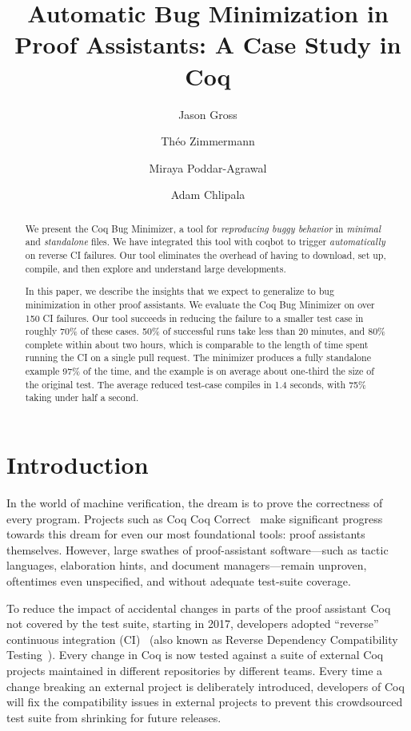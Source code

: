 \documentclass[a4paper,USenglish,cleveref,autoref,thm-restate]{lipics-v2021}
\title{Automatic Bug Minimization in Proof Assistants: A Case Study in Coq}
\author{Jason Gross}{CSAIL, Massachusetts Institute of Technology, 77 Massachusetts Ave., Cambridge, MA 02139, USA \and MIRI, USA \and \url{https://jasongross.github.io/} }{jgross@mit.edu}{https://orcid.org/0000-0002-9427-4891}{}%
\author{Théo Zimmermann}{Inria, Université de Paris, CNRS, IRIF, F-75013, Paris, France \and \url{https://www.theozimmermann.net} }{theo@irif.fr}{https://orcid.org/0000-0002-3580-8806}{}
\author{Miraya Poddar-Agrawal}{Reed College, 3203 SE Woodstock Blvd, Portland, OR 97202, USA%
}{ragrawal@reed.edu}{https://orcid.org/0000-0001-7617-9180}{}
\author{Adam Chlipala}{CSAIL, Massachusetts Institute of Technology, 77 Massachusetts Ave., Cambridge, MA 02139, USA \and \url{http://adam.chlipala.net/} }{adamc@csail.mit.edu}{https://orcid.org/0000-0001-7085-9417}{}
\begin{document}
\maketitle

\begin{abstract}
  We present the Coq Bug Minimizer, a tool for \emph{reproducing buggy behavior} in \emph{minimal} and \emph{standalone} files.
  We have integrated this tool with coqbot to trigger \emph{automatically} on reverse CI failures.
  Our tool eliminates the overhead of having to download, set up, compile, and then explore and understand large developments.

  In this paper, we describe the insights that we expect to generalize to bug minimization in other proof assistants.
  We evaluate the Coq Bug Minimizer on over 150 CI failures.
  Our tool succeeds in reducing the failure to a smaller test case in roughly 70\% of these cases.
  50\% of successful runs take less than 20 minutes, and 80\% complete within about two hours, which is comparable to the length of time spent running the CI on a single pull request.
  The minimizer produces a fully standalone example 97\% of the time, and the example is on average about one-third the size of the original test.
  The average reduced test-case compiles in 1.4 seconds, with 75\% taking under half a second.
\end{abstract}

\section{Introduction}

In the world of machine verification, the dream is to prove the correctness of every program.
Projects such as Coq Coq Correct~\cite{coq-coq-correct} make significant progress towards this dream for even our most foundational tools: proof assistants themselves.
However, large swathes of proof-assistant software—such as tactic languages, elaboration hints, and document managers—remain unproven, oftentimes even unspecified, and without adequate test-suite coverage.


To reduce the impact of accidental changes in parts of the proof assistant Coq not covered by the test suite, starting in 2017, developers adopted ``reverse'' continuous integration (CI)~\cite{zimmermann:tel-02451322} (also known as Reverse Dependency Compatibility Testing~\cite{ochoa2022breakbot}).
Every change in Coq is now tested against a suite of external Coq projects maintained in different repositories by different teams.
Every time a change breaking an external project is deliberately introduced, developers of Coq will fix the compatibility issues in external projects to prevent this crowdsourced test suite from shrinking for future releases.
\end{document}
